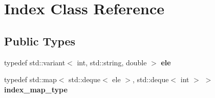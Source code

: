 \hypertarget{classIndex}{}\section{Index Class Reference}
\label{classIndex}
\subsection*{Public Types}
\begin{DoxyCompactItemize}
\item 
\mbox{\label{classIndex_a4d83bd317170e3fa02077e3762cc5550}} 
typedef std\+::variant$<$ int, std\+::string, double $>$ {\bfseries ele}
\item 
\mbox{\label{classIndex_a53740ec6f7dfb1d2a1bb84f558e23384}} 
typedef std\+::map$<$ std\+::deque$<$ ele $>$, std\+::deque$<$ int $>$ $>$ {\bfseries index\+\_\+map\+\_\+type}
\end{DoxyCompactItemize}
